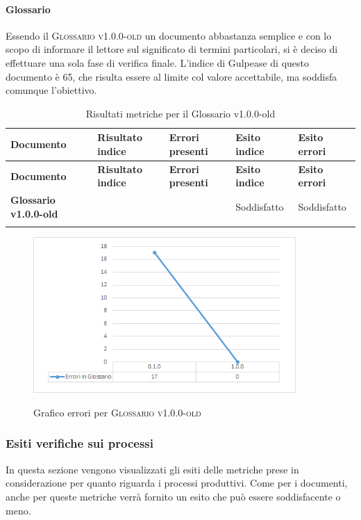 \documentclass[../piano-di-qualifica.tex]{subfiles}
\begin{document}
\paragraph{Glossario}
\label{sub:glossario}
Essendo il \textsc{Glossario v1.0.0-old} un documento abbastanza semplice e con lo scopo di informare il lettore sul significato di termini particolari, si è deciso di effettuare una sola fase di verifica finale.     
L'indice di Gulpease di questo documento è 65, che risulta essere al limite col valore accettabile, ma soddisfa comunque l'obiettivo.

\renewcommand{\arraystretch}{2} %
\begin{longtable}[H]{>{\centering\bfseries}m{6cm} >{\centering}m{2cm} >{\centering}m{2.5cm} >{\centering}m{2.5cm} >{\centering\arraybackslash}m{2.5cm}}  
  \rowcolor{lightgray}
  {\textbf{Documento}} & {\textbf{Risultato indice}} & {\textbf{Errori presenti}} & {\textbf{Esito indice}} & {\textbf{Esito errori}}  \\
  \endfirsthead%
  \rowcolor{lightgray}
  {\textbf{Documento}} & {\textbf{Risultato indice}} & {\textbf{Errori presenti}} & {\textbf{Esito indice}} & {\textbf{Esito errori}}  \\
  \endhead%
  \textbf{Glossario v1.0.0-old} & 65                 & 0               & Soddisfatto & Soddisfatto \\
  \caption{Risultati metriche per il Glossario v1.0.0-old}
  \label{tab:my-table}
\end{longtable}

\begin{figure}[H]
  \centering
  \includegraphics[width=10cm]{img/erroriGlossario.png}
  \label{fig:scice_documenti}
  \caption{Grafico errori per \textsc{Glossario v1.0.0-old}}
\end{figure}

\subsubsection{Esiti verifiche sui processi}
\label{sub:esiti_verifiche_sui_processi}
In questa sezione vengono visualizzati gli esiti delle metriche prese in considerazione per quanto riguarda i processi produttivi.
Come per i documenti, anche per queste metriche verrà fornito un esito che può essere soddisfacente o meno.
\end{document}
